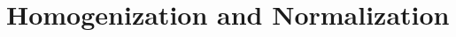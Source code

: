 \documentclass{subfile}
\begin{document}
	\chapter{Homogenization and Normalization}\label{ch:homonorm}
\end{document}
